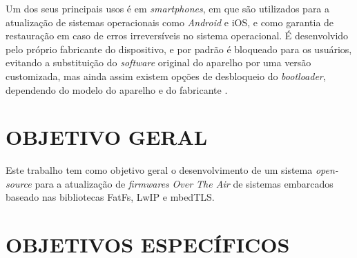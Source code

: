 Um dos seus principais usos é em \textit{smartphones}, em que são utilizados para a atualização de sistemas operacionais como \textit{Android} e iOS, e como garantia de restauração em caso de erros irreversíveis no sistema operacional. É desenvolvido pelo próprio fabricante do dispositivo, e por padrão é bloqueado para os usuários, evitando a substituição do \textit{software} original do aparelho por uma versão customizada, mas ainda assim existem opções de desbloqueio do \textit{bootloader}, dependendo do modelo do aparelho e do fabricante \cite{Salute2018}.%





\section{OBJETIVO GERAL}
\label{sec:Objetivo Geral}

Este trabalho tem como objetivo geral o desenvolvimento de um sistema \textit{open-source} para a atualização  de \textit{firmwares} \textit{Over The Air} de sistemas embarcados baseado nas bibliotecas FatFs, LwIP e mbedTLS. 

\section{OBJETIVOS ESPECÍFICOS}
\label{sec:Objetivos Específicos}

